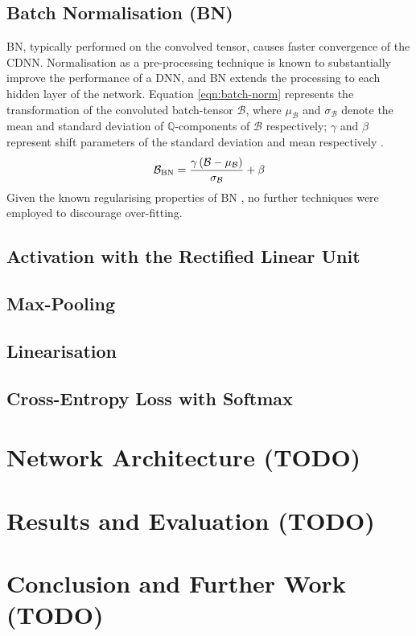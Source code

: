 \documentclass[journal]{IEEEtran}
\begin{document}
\subsection{Batch Normalisation (BN)}
BN, typically performed on the convolved tensor, causes faster convergence of
the CDNN\footnotemark. Normalisation as a pre-processing technique is known to
substantially improve the performance of a DNN, and BN extends the processing to
each hidden layer of the network. Equation \eqref{eqn:batch-norm} represents the
transformation of the convoluted batch-tensor $\mathcal{B}$, where
$\mu_\mathcal{B}$ and $\sigma_\mathcal{B}$ denote the mean and standard
deviation of $\mathbb{Q}$-components of $\mathcal{B}$ respectively; $\gamma$ and
$\beta$ represent shift parameters of the standard deviation and mean
respectively \cite{Laarhoven:2017}.
\begin{equation}
    \mathcal{B}_\text{BN} = \frac{%
        \gamma\left(\mathcal{B}-\mu_\mathcal{B}\right)}
    {\sigma_\mathcal{B}} + \beta \label{eqn:batch-norm}
\end{equation}
Given the known regularising properties of BN \cite{Luo:2019}, no further
techniques were employed to discourage over-fitting.

\subsection{Activation with the Rectified Linear Unit}
\subsection{Max-Pooling}
\subsection{Linearisation}
\subsection{Cross-Entropy Loss with Softmax}

\section{Network Architecture (TODO)}
\section{Results and Evaluation (TODO)}
\section{Conclusion and Further Work (TODO)}

\clearpage %


\end{document}
